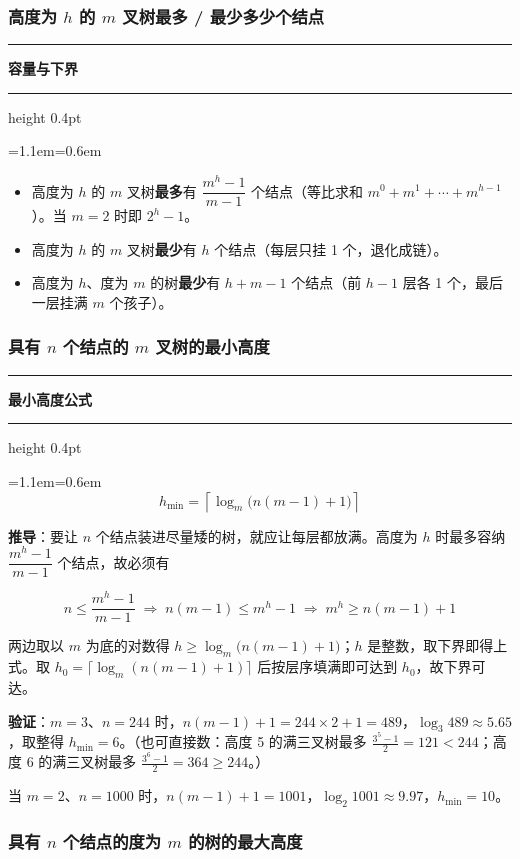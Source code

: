 \documentclass[11pt,openany,UTF8]{ctexbook}
\newcommand{\callouthead}[2]{%
  \par\addvspace{7pt}\noindent
  {\color{#1}\rule[-0.15em]{3pt}{1.05em}}\hspace{0.5em}%
  {\bfseries\color{#1}#2}\par\nobreak\vspace{-0.35em}%
  {\color{rulesep}\hrule height 0.4pt}\nobreak\vspace{0.45em}%
  \begingroup\small\setlength{\parindent}{0pt}%
  \leftskip=1.1em\rightskip=0.6em\noindent\ignorespaces}
\newcommand{\calloutend}{\par\endgroup\addvspace{7pt}}
\newenvironment{callkey}[1]{\callouthead{keybar}{#1}}{\calloutend}
\begin{document}
\subsubsection{高度为 $h$ 的 $m$ 叉树最多 / 最少多少个结点}

\begin{callkey}{容量与下界}
\begin{itemize}
\item 高度为 $h$ 的 $m$ 叉树\textbf{最多}有 $\dfrac{m^h-1}{m-1}$ 个结点（等比求和 $m^0+m^1+\cdots+m^{h-1}$）。当 $m=2$ 时即 $2^h-1$。
\item 高度为 $h$ 的 $m$ 叉树\textbf{最少}有 $h$ 个结点（每层只挂 1 个，退化成链）。
\item 高度为 $h$、度为 $m$ 的树\textbf{最少}有 $h+m-1$ 个结点（前 $h-1$ 层各 1 个，最后一层挂满 $m$ 个孩子）。
\end{itemize}
\end{callkey}

\subsubsection{具有 $n$ 个结点的 $m$ 叉树的最小高度}

\begin{callkey}{最小高度公式}
\[h_{\min}=\left\lceil \log_m\bigl(n(m-1)+1\bigr)\right\rceil\]

\textbf{推导}：要让 $n$ 个结点装进尽量矮的树，就应让每层都放满。高度为 $h$ 时最多容纳 $\dfrac{m^h-1}{m-1}$ 个结点，故必须有

\[n\le\frac{m^h-1}{m-1}\;\Longrightarrow\; n(m-1)\le m^h-1\;\Longrightarrow\; m^h\ge n(m-1)+1\]

两边取以 $m$ 为底的对数得 $h\ge\log_m\bigl(n(m-1)+1\bigr)$；$h$ 是整数，取下界即得上式。取 $h_0=\lceil\log_m(n(m-1)+1)\rceil$ 后按层序填满即可达到 $h_0$，故下界可达。

\end{callkey}

\textbf{验证}：$m=3$、$n=244$ 时，$n(m-1)+1=244\times2+1=489$，$\log_3 489\approx 5.65$，取整得 $h_{\min}=6$。（也可直接数：高度 5 的满三叉树最多 $\frac{3^5-1}{2}=121<244$；高度 6 的满三叉树最多 $\frac{3^6-1}{2}=364\ge244$。）

当 $m=2$、$n=1000$ 时，$n(m-1)+1=1001$，$\log_2 1001\approx 9.97$，$h_{\min}=10$。

\subsubsection{具有 $n$ 个结点的度为 $m$ 的树的最大高度}
\end{document}
